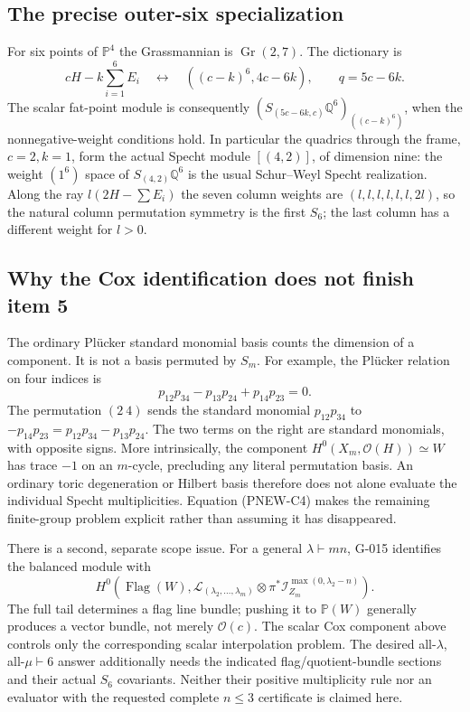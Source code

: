 \subsection{The precise outer-six specialization}
For six points of $\mathbb P^4$ the Grassmannian is
$\operatorname{Gr}(2,7)$.  The dictionary is
\[
 cH-k\sum_{i=1}^6E_i
 \quad\longleftrightarrow\quad
 ((c-k)^6,4c-6k),
 \qquad q=5c-6k.
 \tag{PNEW-C9}
\]
The scalar fat-point module is consequently
$\left(S_{(5c-6k,c)}\mathbb Q^6\right)_{((c-k)^6)}$,
when the nonnegative-weight conditions hold.  In particular
the quadrics through the frame, $c=2,k=1$, form the actual
Specht module $[(4,2)]$, of dimension nine: the weight
$(1^6)$ space of $S_{(4,2)}\mathbb Q^6$ is the usual
Schur--Weyl Specht realization.  Along the ray
$l(2H-\sum E_i)$ the seven column weights are
$(l,l,l,l,l,l,2l)$, so the natural column permutation
symmetry is the first $S_6$; the last column has a different
weight for $l>0$.

\subsection{Why the Cox identification does not finish item 5}
The ordinary Pl\"ucker standard monomial basis counts the
dimension of a component.  It is not a basis permuted by
$S_m$.  For example, the Pl\"ucker relation on four indices
is
\[
 p_{12}p_{34}-p_{13}p_{24}+p_{14}p_{23}=0.
\]
The permutation $(2\ 4)$ sends the standard monomial
$p_{12}p_{34}$ to
$-p_{14}p_{23}=p_{12}p_{34}-p_{13}p_{24}$.
The two terms on the right are standard monomials, with
opposite signs.  More intrinsically, the component
$H^0(X_m,\mathcal O(H))\simeq W$ has trace $-1$ on an
$m$-cycle, precluding any literal permutation basis.
An ordinary toric degeneration or Hilbert basis therefore
does not alone evaluate the individual Specht multiplicities.
Equation (PNEW-C4) makes the remaining finite-group problem
explicit rather than assuming it has disappeared.

There is a second, separate scope issue.  For a general
$\lambda\vdash mn$, G-015 identifies the balanced module
with
\[
 H^0\!\left(\operatorname{Flag}(W),
   \mathcal L_{(\lambda_2,\ldots,\lambda_m)}
       \otimes\pi^*\mathcal I_{Z_m}^{\max(0,\lambda_2-n)}\right).
 \tag{PNEW-C10}
\]
The full tail determines a flag line bundle; pushing it
to $\mathbb P(W)$ generally produces a vector bundle,
not merely $\mathcal O(c)$.  The scalar Cox component above
controls only the corresponding scalar interpolation
problem.  The desired all-$\lambda$, all-$\mu\vdash6$
answer additionally needs the indicated flag/quotient-bundle
sections and their actual $S_6$ covariants.  Neither their
positive multiplicity rule nor an evaluator with the
requested complete $n\le3$ certificate is claimed here.

